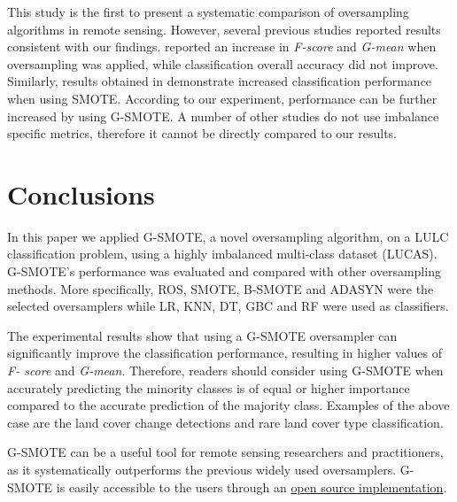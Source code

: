 \documentclass[remotesensing,article,submit,moreauthors,pdftex]{Definitions/mdpi}
\begin{document}
This study is the first to present a systematic comparison of oversampling
algorithms in remote sensing. However, several previous studies reported results
consistent with our findings. \cite{Bogner2018} reported an increase in
\textit{F-score} and \textit{G-mean} when oversampling was applied, while
classification overall accuracy did not improve. Similarly, results obtained in
\cite{Feng2019} demonstrate increased classification performance when using
SMOTE. According to our experiment, performance can be further increased by
using G-SMOTE. A number of other studies \cite{Cenggoro2018, Maxwell2018} do not
use imbalance specific metrics, therefore it cannot be directly compared to our
results.

\section{Conclusions}

In this paper we applied G-SMOTE, a novel oversampling algorithm, on a LULC
classification problem, using a highly imbalanced multi-class dataset (LUCAS).
G-SMOTE's performance was evaluated and compared with other oversampling
methods. More specifically, ROS, SMOTE, B-SMOTE and ADASYN were the selected
oversamplers while LR, KNN, DT, GBC and RF were used as classifiers.

The experimental results show that using a G-SMOTE oversampler can significantly
improve the classification performance, resulting in higher values of \textit{F-
score} and \textit{G-mean}. Therefore, readers should consider using G-SMOTE
when accurately predicting the minority classes is of equal or higher importance
compared to the accurate prediction of the majority class. Examples of the above
case are the land cover change detections and rare land cover type
classification.

G-SMOTE can be a useful tool for remote sensing researchers and practitioners,
as it systematically outperforms the previous widely used oversamplers.
G-SMOTE is easily accessible to the users through an
\href{https://geometric-smote.readthedocs.io/en/latest/?badge=latest}{open
	source implementation}.

\vspace{6pt}

\end{document}
